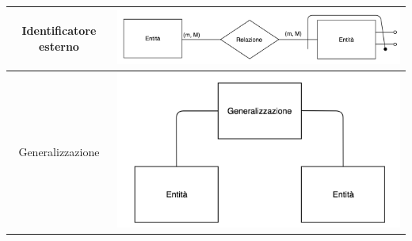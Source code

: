 \begin{table}
\begin{center}
\begin{tabular}{|c|c|}
        Identificatore esterno & \includegraphics[scale = 0.4]{13/img7}  \\ \hline
        Generalizzazione & \includegraphics[scale = 0.4]{13/img8}  \\ \hline
        \end{tabular}\end{center}
    \end{table}

